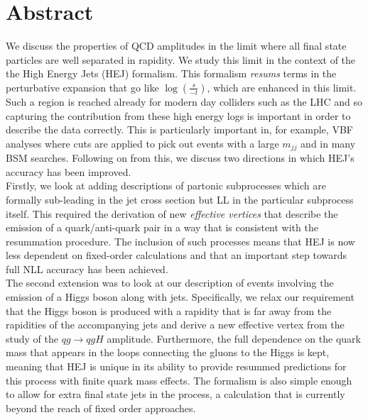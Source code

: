 \chapter{Abstract}

We discuss the properties of QCD amplitudes in the limit where all final state particles are well separated in rapidity. We study this limit in the context of the the High Energy Jets (HEJ) formalism. This formalism \emph{resums} terms in the perturbative expansion that go like $\log(\frac{s}{-t})$, which are enhanced in this limit. Such a region is reached already for modern day colliders such as the LHC and so capturing the contribution from these high energy logs is important in order to describe the data correctly. This is particularly important in, for example, VBF analyses where cuts are applied to pick out events with a large $m_{jj}$ and in many BSM searches. Following on from this, we discuss two directions in which HEJ's accuracy has been improved. \\
Firstly, we look at adding descriptions of partonic subprocesses which are formally sub-leading in the jet cross section but LL in the particular subprocess itself. This required the derivation of new \emph{effective vertices} that describe the emission of a quark/anti-quark pair in a way that is consistent with the resummation procedure. The inclusion of such processes means that HEJ is now less dependent on fixed-order calculations and that an important step towards full NLL accuracy has been achieved. \\
The second extension was to look at our description of events involving the emission of a Higgs boson along with jets. Specifically, we relax our requirement that the Higgs boson is produced with a rapidity that is far away from the rapidities of the accompanying jets and derive a new effective vertex from the study of the $qg \to qgH$ amplitude. Furthermore, the full dependence on the quark mass that appears in the loops connecting the gluons to the Higgs is kept, meaning that HEJ is unique in its ability to provide resummed predictions for this process with finite quark mass effects. The formalism is also simple enough to allow for extra final state jets in the process, a calculation that is currently beyond the reach of fixed order approaches. 